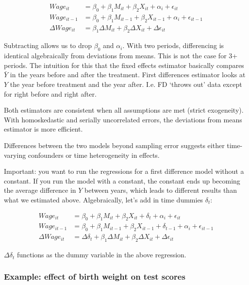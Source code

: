 \documentclass[12 pt, leqno]{article}
\begin{document}
\begin{align*}
Wage_{it} &= \beta_0 + \beta_1 M_{it} + \beta_2 X_{it} + \alpha_i + \epsilon_{it} \\
Wage_{it-1} &= \beta_0 + \beta_1 M_{it-1} + \beta_2 X_{it-1} + \alpha_i + \epsilon_{it-1} \\
\Delta Wage_{it}& = \beta_1 \Delta M_{it} + \beta_2 \Delta X_{it} + \Delta \epsilon_{it}
\end{align*}

Subtracting allows us to drop $\beta_0$ and $\alpha_i$. With two periods, differencing is identical algebraically from deviations from means. This is not the case for 3+ periods. The intuition for this that the fixed effects estimator basically compares $\bar{Y}$ in the years before and after the treatment. First differences estimator looks at $Y$ the year before treatment and the year after. I.e. FD `throws out' data except for right before and right after. 

Both estimators are consistent when all assumptions are met (strict exogeneity). With homoskedastic and serially uncorrelated errors, the deviations from means estimator is more efficient. 

Differences between the two models beyond sampling error suggests either time-varying confounders or time heterogeneity in effects. 

Important: you want to run the regressions for a first difference model without a constant. If you run the model with a constant, the constant ends up becoming the average difference in $Y$ between years, which leads to different results than what we estimated above. Algebraically, let's add in time dummies $\delta_t$:

\begin{align*}
Wage_{it} &= \beta_0 + \beta_1 M_{it} + \beta_2 X_{it} + \delta_t + \alpha_i + \epsilon_{it} \\
Wage_{it-1} &= \beta_0 + \beta_1 M_{it-1} + \beta_2 X_{it-1} + \delta_{t-1}+ \alpha_i + \epsilon_{it-1} \\
\Delta Wage_{it}& = \Delta \delta_t + \beta_1 \Delta M_{it} + \beta_2 \Delta X_{it} + \Delta \epsilon_{it}
\end{align*}

$\Delta \delta_t$ functions as the dummy variable in the above regression.

\subsubsection{Example: effect of birth weight on test scores}
\end{document}
